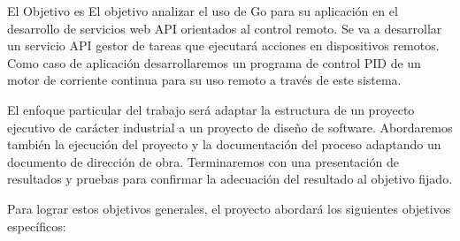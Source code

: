 
El Objetivo es
El objetivo analizar el uso de Go para su aplicación en el desarrollo de servicios web API orientados al control remoto. Se va a desarrollar un servicio API gestor de tareas que ejecutará acciones en dispositivos remotos. Como caso de aplicación desarrollaremos un programa de control PID de un motor de corriente continua para su uso remoto a través de este sistema.

El enfoque particular del trabajo será adaptar la estructura de un proyecto ejecutivo de carácter industrial a un proyecto de diseño de software. Abordaremos también la ejecución del proyecto y la documentación del proceso adaptando un documento de dirección de obra. Terminaremos con una presentación de resultados y pruebas para confirmar la adecuación del resultado al objetivo fijado.

Para lograr estos objetivos generales, el proyecto abordará los siguientes objetivos específicos:
